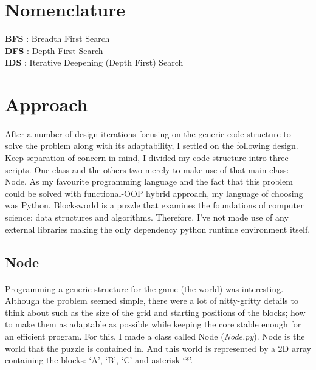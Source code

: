 \documentclass[10pt]{article}
\begin{document}
\newpage																		

\tableofcontents 


\section*{Nomenclature}
\textbf{BFS} : Breadth First Search \\
\textbf{DFS} : Depth First Search \\
\textbf{IDS} : Iterative Deepening (Depth First) Search

\newpage

  \section{Approach}
  \paragraph{} \indent
  After a number of design iterations focusing on the generic code structure to solve the problem along with its adaptability, I settled on the following design. Keep separation of concern in mind, I divided my code structure intro three scripts. One class and the others two merely to make use of that main class: Node. As my favourite programming language and the fact that this problem could be solved with functional-OOP hybrid approach, my language of choosing was Python. Blocksworld is a puzzle that examines the foundations of computer science: data structures and algorithms. Therefore, I’ve not made use of any external libraries making the only dependency python runtime environment itself.

  \subsection{Node}
  \paragraph{} \indent
  Programming a generic structure for the game (the world) was interesting. Although the problem seemed simple, there were a lot of nitty-gritty details to think about such as the size of the grid and starting positions of the blocks; how to make them as adaptable as possible while keeping the core stable enough for an efficient program. For this, I made a class called Node (\textit{Node.py}). Node is the world that the puzzle is contained in. And this world is represented by a 2D array containing the blocks: `A', `B', `C' and asterisk `*'. \\
  
\end{document}
